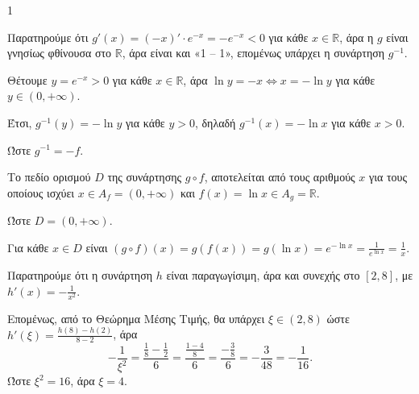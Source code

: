 \begin{ylh}{1}
    \item [Λύση]
\end{ylh}
\begin{alist}
    \item Παρατηρούμε ότι $g'(x) = (-x)' \cdot e^{-x} = -e^{-x} < 0$ για κάθε $x \in \mathbb{R}$, άρα η $g$ είναι γνησίως φθίνουσα στο $\mathbb{R}$, άρα είναι και «1 -- 1», επομένως υπάρχει η συνάρτηση $g^{-1}$.
    
    Θέτουμε $y = e^{-x} > 0$ για κάθε $x \in \mathbb{R}$, άρα $\ln y = -x \Leftrightarrow x = -\ln y$ για κάθε $y \in (0, +\infty)$.
    
    Έτσι, $g^{-1}(y) = -\ln y$ για κάθε $y > 0$, δηλαδή $g^{-1}(x) = -\ln x$ για κάθε $x > 0$.
    
    Ώστε $g^{-1} = -f$.
    
    \item Το πεδίο ορισμού $D$ της συνάρτησης $g \circ f$, αποτελείται από τους αριθμούς $x$ για τους οποίους ισχύει $x \in A_f = (0, +\infty)$ και $f(x) = \ln x \in A_g = \mathbb{R}$.
    
    Ώστε $D = (0, +\infty)$.
    
    Για κάθε $x \in D$ είναι $(g \circ f)(x) = g(f(x)) = g(\ln x) = e^{-\ln x} = \frac{1}{e^{\ln x}} = \frac{1}{x}$.
    
    \item Παρατηρούμε ότι η συνάρτηση $h$ είναι παραγωγίσιμη, άρα και συνεχής στο $[2, 8]$, με $h'(x) = -\frac{1}{x^2}$.
    
    Επομένως, από το Θεώρημα Μέσης Τιμής, θα υπάρχει $\xi \in (2, 8)$ ώστε $h'(\xi) = \frac{h(8)-h(2)}{8-2}$, άρα
    \[ -\frac{1}{\xi^2} = \frac{\frac{1}{8} - \frac{1}{2}}{6} = \frac{\frac{1-4}{8}}{6} = \frac{-\frac{3}{8}}{6} = -\frac{3}{48} = -\frac{1}{16}. \]
    Ώστε $\xi^2 = 16$, άρα $\xi = 4$.
\end{alist}